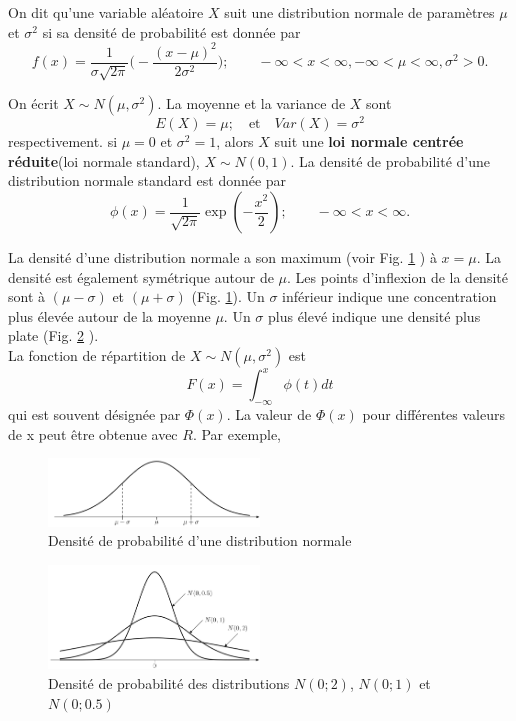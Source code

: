 {\theoremstyle{definition}
\begin{definition}
    On dit qu'une variable aléatoire $X$ suit une distribution normale de paramètres $\mu$ et $\sigma^2$ si sa
    densité de probabilité est donnée par
    \begin{equation}\label{eq:gauss}
        f(x)=\frac{1}{\sigma\sqrt{2\pi}}\bigg(-\frac{(x-\mu)^2}{2\sigma^2}\bigg); \quad\mathrm{   }\quad
        -\infty<x<\infty,-\infty<\mu<\infty,\sigma^2>0.
    \end{equation}
\end{definition}
On écrit $X\sim N(\mu,\sigma^2)$. La moyenne et la variance de $X$ sont
$$E(X)=\mu;\quad\mathrm{  et }\quad Var(X) =\sigma^2$$ respectivement. si $\mu=0$ et $\sigma^2=1$, alors $X$ suit une
\textbf{loi normale centrée réduite}(loi normale standard), $X\sim N(0,1)$. La densité de probabilité d'une
distribution normale standard est donnée par $$\phi(x)=\frac{1}{\sqrt{2\pi}}\exp(-\frac{x^2}{2});\quad\mathrm{   }\quad
-\infty<x<\infty.$$

La densité d'une distribution normale a son maximum (voir Fig. \ref{fig:pdfgauss} ) à $x = \mu$. La densité est également symétrique
autour de $\mu$. Les points d'inflexion de la densité sont à $(\mu - \sigma)$ et $(\mu + \sigma)$ (Fig. \ref{fig:pdfgauss}).
Un $\sigma$ inférieur indique une concentration plus élevée autour de la moyenne $\mu$. Un $\sigma$ plus élevé
indique une densité plus plate (Fig. \ref{fig:pdfsgauss} ).\\
La fonction de répartition de $X\sim N(\mu,\sigma^2)$ est
\begin{equation}\label{eq:frgauss}
    F(x)=\int_{-\infty}^{x}\phi(t)dt
\end{equation}
qui est souvent désignée par $\Phi(x)$. La valeur de $\Phi(x)$ pour différentes valeurs de x peut être obtenue avec $R$.
Par exemple,

\begin{figure}[h]
    \centering
    \includegraphics[width=0.5\textwidth]{content/pdfgauss}
    \caption{Densité de probabilité d'une distribution normale}
    \label{fig:pdfgauss}
\end{figure}

\begin{figure}[h]
    \centering
    \includegraphics[width=0.5\textwidth]{content/pdfsgauss}
    \caption{Densité de probabilité des distributions $N(0;2)$, $N(0;1)$ et $N(0;0.5)$}
    \label{fig:pdfsgauss}
\end{figure}

}

